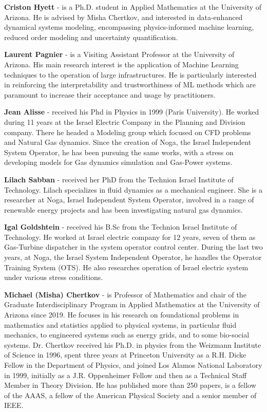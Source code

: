 
\textbf{Criston Hyett} - is a Ph.D. student in Applied Mathematics at the University of Arizona. He is advised by Misha Chertkov, and interested in data-enhanced dynamical systems modeling, encompassing physics-informed machine learning, reduced order modeling and uncertainty quantification.

\noindent
\textbf{Laurent Pagnier} - is a Visiting Assistant Professor at the University of Arizona. His main research interest is the application of Machine Learning techniques to the operation of large infrastructures. He is particularly interested in reinforcing the interpretability and trustworthiness of ML methods which are paramount to increase their acceptance and usage by practitioners.

\noindent
\textbf{Jean Alisse} - received his Phd in Physics in 1999 (Paris University). He worked during 11 years at the Israel Electric Company in the Planning and Division company.
There he headed a Modeling group which focused on CFD problems and Natural Gas dynamics. Since the creation of Noga, the Israel Independent System Operator, he has been pursuing the same works, with a stress on developing models for Gas dynamics simulation and Gas-Power systems. 

 \noindent
\textbf{Lilach Sabban} - received her PhD from the Technion Israel Institute of Technology. Lilach specializes in fluid dynamics as a mechanical engineer. She is a researcher at Noga, Israel Independent System Operator,  involved in a range of renewable energy projects and has been investigating natural gas dynamics.

\noindent
\textbf{Igal Goldshtein} - received his B.Sc from the Technion Israel Institute of Technology. He worked at Israel electric company for 12 years, seven of them as Gas-Turbine dispatcher in the system operator control center. During the last two years, at Noga, the Israel System Independent Operator, he handles the Operator Training System (OTS). He also researches operation of Israel electric system under various stress conditions.

\noindent
\textbf{Michael (Misha) Chertkov} - is Professor of Mathematics and chair of the Graduate Interdisciplinary Program in Applied Mathematics at the University of Arizona since 2019. He focuses in his research on foundational problems in mathematics and statistics applied to physical systems, in particular fluid mechanics, to engineered systems such as energy grids, and to some bio-social systems. Dr. Chertkov received his Ph.D. in physics from the Weizmann Institute of Science in 1996, spent three years at Princeton University as a R.H. Dicke Fellow in the Department of Physics, and joined Los Alamos National Laboratory in 1999, initially as a J.R. Oppenheimer Fellow and then as a Technical Staff Member in Theory Division. He has published more than 250 papers, is a fellow of the AAAS, a fellow of the American Physical Society and a senior member of IEEE.
